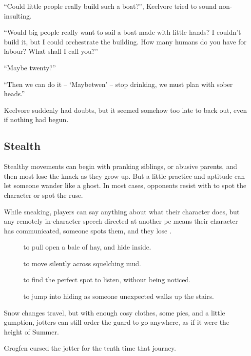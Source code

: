 \begin{multicols}{2}
\begin{exampletext}
  ``Could little people really build such a boat?'', Keelvore tried to sound non-insulting.

  ``Would big people really want to sail a boat made with little hands?
  I couldn't build it, but I could orchestrate the building.
  How many humans do you have for labour?
  What shall I call you?''

  ``Maybe twenty?''

  ``Then we can do it -- `Maybetwen' -- stop drinking, we must plan with sober heads.''

  Keelvore suddenly had doubts, but it seemed somehow too late to back out, even if nothing had begun.
\end{exampletext}

\subsection{Stealth}

Stealthy movements can begin with pranking siblings, or abusive parents, and then most lose the knack as they grow up.
But a little practice and aptitude can let someone wander like a ghost.
In most cases, opponents resist with  to spot the character or spot the ruse.

While sneaking, players can say anything about what their character does, but any remotely in-character speech directed at another \gls{pc} means their character has communicated, someone spots them, and they lose .

\begin{description}
  \item[]
    to pull open a bale of hay, and hide inside.
  \item[]
    to move silently across squelching mud.
  \item[]
    to find the perfect spot to listen, without being noticed.
  \item[]
    to jump into hiding as someone unexpected walks up the stairs.
\end{description}

\begin{exampletext}
  Snow changes travel, but with enough cosy clothes, some pies, and a little gumption, \glspl{jotter} can still order the \gls{guard} to go anywhere, as if it were the height of Summer.

  Grogfen cursed the \gls{jotter} for the tenth time that journey.


\end{exampletext}
\end{multicols}
